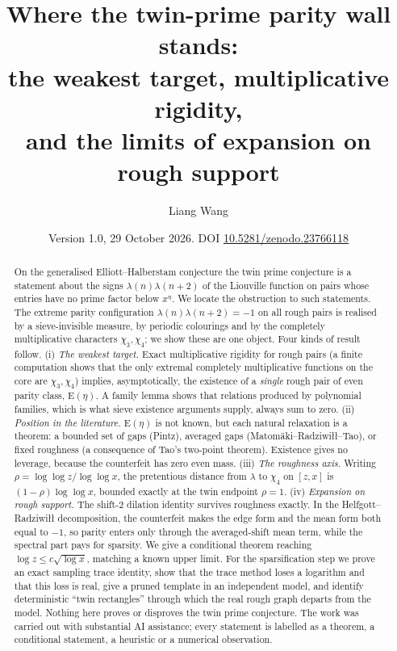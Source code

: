 \documentclass[11pt]{amsart}
\title[Where the twin-prime parity wall stands]{Where the twin-prime parity wall stands:\\ the weakest target, multiplicative rigidity,\\ and the limits of expansion on rough support}
\author{Liang Wang}
\date{Version 1.0, 29 October 2026. DOI \href{https://doi.org/10.5281/zenodo.23766118}{10.5281/zenodo.23766118}}
\theoremstyle{definition}
\theoremstyle{remark}
\newcommand{\EE}{\mathrm E}
\begin{document}
\begin{abstract}
On the generalised Elliott--Halberstam conjecture the twin prime conjecture is a statement about the signs $\lambda(n)\lambda(n+2)$ of the Liouville function on pairs whose entries have no prime factor below $x^\eta$. We locate the obstruction to such statements. The extreme parity configuration $\lambda(n)\lambda(n+2)=-1$ on all rough pairs is realised by a sieve-invisible measure, by periodic colourings and by the completely multiplicative characters $\chi_3,\chi_4$; we show these are one object. Four kinds of result follow.
(i) \emph{The weakest target.} Exact multiplicative rigidity for rough pairs (a finite computation shows that the only extremal completely multiplicative functions on the core are $\chi_3,\chi_4$) implies, asymptotically, the existence of a \emph{single} rough pair of even parity class, $\EE(\eta)$. A family lemma shows that relations produced by polynomial families, which is what sieve existence arguments supply, always sum to zero.
(ii) \emph{Position in the literature.} $\EE(\eta)$ is not known, but each natural relaxation is a theorem: a bounded set of gaps (Pintz), averaged gaps (Matom\"aki--Radziwi\l{}\l{}--Tao), or fixed roughness (a consequence of Tao's two-point theorem). Existence gives no leverage, because the counterfeit has zero even mass.
(iii) \emph{The roughness axis.} Writing $\rho=\log\log z/\log\log x$, the pretentious distance from $\lambda$ to $\chi_4$ on $[z,x]$ is $(1-\rho)\log\log x$, bounded exactly at the twin endpoint $\rho=1$.
(iv) \emph{Expansion on rough support.} The shift-$2$ dilation identity survives roughness exactly. In the Helfgott--Radziwi\l{}\l{} decomposition, the counterfeit makes the edge form and the mean form both equal to $-1$, so parity enters only through the averaged-shift mean term, while the spectral part pays for sparsity. We give a conditional theorem reaching $\log z\le c\sqrt{\log x}$, matching a known upper limit. For the sparsification step we prove an exact sampling trace identity, show that the trace method loses a logarithm and that this loss is real, give a pruned template in an independent model, and identify deterministic ``twin rectangles'' through which the real rough graph departs from the model.
Nothing here proves or disproves the twin prime conjecture. The work was carried out with substantial AI assistance; every statement is labelled as a theorem, a conditional statement, a heuristic or a numerical observation.
\end{abstract}
\maketitle
\end{document}

